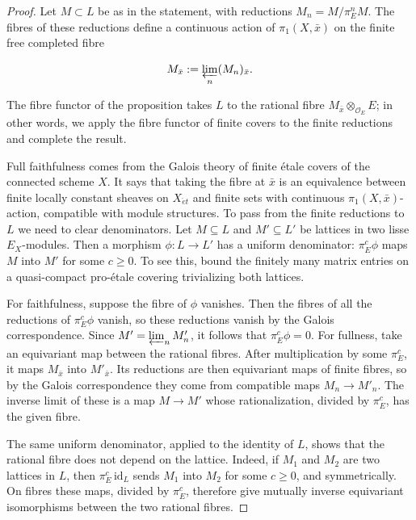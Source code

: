 \documentclass[11pt]{article}
\begin{document}
\begin{proof}[{Proof}]\label{bp33}%
Let \(M\subset L\) be as in the statement, with reductions \(M_n=M/\pi_E^nM\). The fibres of these reductions define a continuous action of \(\pi_1(X,\bar x)\) on the finite free completed fibre

\[
M_{\bar x}:=\varprojlim_n(M_n)_{\bar x}.
\]

The fibre functor of the proposition takes \(L\) to the rational fibre \(M_{\bar x}\otimes_{\mathcal O_E}E\); in other words, we apply the fibre functor of finite covers to the finite reductions and complete the result.

Full faithfulness comes from the Galois theory of finite étale covers of the connected scheme \(X\). It says that taking the fibre at \(\bar x\) is an equivalence between finite locally constant sheaves on \(X_{\acute{e}t}\) and finite sets with continuous \(\pi_1(X,\bar x)\)-action, compatible with module structures. To pass from the finite reductions to \(L\) we need to clear denominators. Let \(M\subseteq L\) and \(M'\subseteq L'\) be lattices in two lisse \(E_X\)-modules. Then a morphism \(\phi:L\to L'\) has a uniform denominator: \(\pi_E^c\phi\) maps \(M\) into \(M'\) for some \(c\geq0\). To see this, bound the finitely many matrix entries on a quasi-compact pro-étale covering trivializing both lattices.

For faithfulness, suppose the fibre of \(\phi\) vanishes. Then the fibres of all the reductions of \(\pi_E^c\phi\) vanish, so these reductions vanish by the Galois correspondence. Since \(M'=\varprojlim_nM'_n\), it follows that \(\pi_E^c\phi=0\). For fullness, take an equivariant map between the rational fibres. After multiplication by some \(\pi_E^c\), it maps \(M_{\bar x}\) into \(M'_{\bar x}\). Its reductions are then equivariant maps of finite fibres, so by the Galois correspondence they come from compatible maps \(M_n\to M'_n\). The inverse limit of these is a map \(M\to M'\) whose rationalization, divided by \(\pi_E^c\), has the given fibre.

The same uniform denominator, applied to the identity of \(L\), shows that the rational fibre does not depend on the lattice. Indeed, if \(M_1\) and \(M_2\) are two lattices in \(L\), then \(\pi_E^c\,\mathrm{id}_{L}\) sends \(M_1\) into \(M_2\) for some \(c\geq0\), and symmetrically. On fibres these maps, divided by \(\pi_E^c\), therefore give mutually inverse equivariant isomorphisms between the two rational fibres.


\end{proof}
\end{document}
